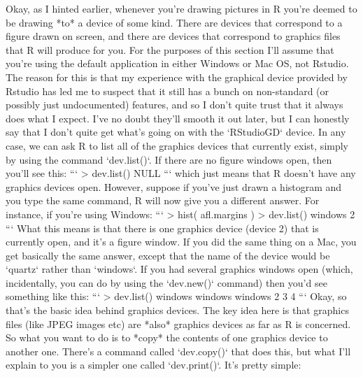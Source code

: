 Okay, as I hinted earlier, whenever you're drawing pictures in R you're deemed to be drawing *to* a device of some kind.  There are devices that correspond to a figure drawn on screen, and there are devices that correspond to graphics files that R will produce for you. For the purposes of this section I'll assume that you're using the default application in either Windows or Mac OS, not Rstudio. The reason for this is that my experience with the graphical device provided by Rstudio has led me to suspect that it still has a bunch on non-standard (or possibly just undocumented) features, and so I don't quite trust that it always does what I expect. I've no doubt they'll smooth it out later, but I can honestly say that I don't quite get what's going on with the `RStudioGD` device.  In any case, we can ask R to list all of the graphics devices that currently exist, simply by using the command `dev.list()`. If there are no figure windows open, then you'll see this:
```
> dev.list()
NULL
```
which just means that R doesn't have any graphics devices open. However, suppose if you've just drawn a histogram and you type the same command, R will now give you a different answer. For instance, if you're using Windows:
```
> hist( afl.margins )
> dev.list()
windows 
      2
```
What this means is that there is one graphics device (device 2) that is currently open, and it's a figure window. If you did the same thing on a Mac, you get basically the same answer, except that the name of the device would be `quartz` rather than `windows`. If you had several graphics windows open (which, incidentally, you can do by using the `dev.new()` command) then you'd see something like this:
```
> dev.list()
windows windows windows  
      2       3       4 
```
Okay, so that's the basic idea behind graphics devices. The key idea here is that graphics files (like JPEG images etc) are *also* graphics devices as far as R is concerned. So what you want to do is to *copy* the contents of one graphics device to another one. There's a command called `dev.copy()` that does this, but what I'll explain to you is a simpler one called `dev.print()`. It's pretty simple:

